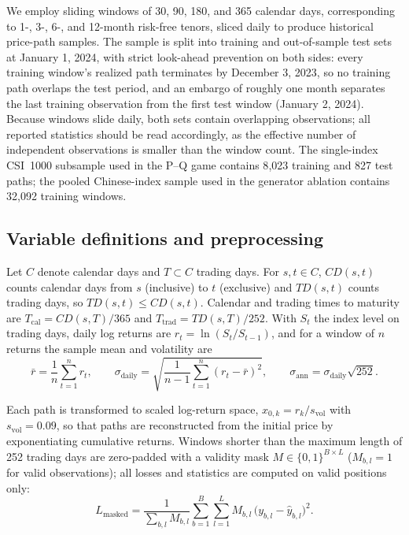 \documentclass[12pt,letterpaper]{article}
\begin{document}
We employ sliding windows of 30, 90, 180, and 365 calendar days,
corresponding to 1-, 3-, 6-, and 12-month risk-free tenors, sliced daily to
produce historical price-path samples. The sample is split into training and
out-of-sample test sets at January 1, 2024, with strict look-ahead
prevention on both sides: every training window's realized path terminates
by December 3, 2023, so no training path overlaps the test period, and an
embargo of roughly one month separates the last training observation from
the first test window (January 2, 2024). Because windows slide daily, both
sets contain overlapping observations; all reported statistics should be
read accordingly, as the effective number of independent observations is
smaller than the window count. The single-index CSI~1000 subsample used in the P--Q game
contains 8{,}023 training and 827 test paths; the pooled Chinese-index sample
used in the generator ablation contains 32{,}092 training windows.

\subsection{Variable definitions and preprocessing}

Let $C$ denote calendar days and $T \subset C$ trading days. For
$s, t \in C$, $CD(s,t)$ counts calendar days from $s$ (inclusive) to $t$
(exclusive) and $TD(s,t)$ counts trading days, so $TD(s,t) \le CD(s,t)$.
Calendar and trading times to maturity are $T_{\mathrm{cal}} = CD(s,T)/365$
and $T_{\mathrm{trad}} = TD(s,T)/252$. With $S_t$ the index level on trading
days, daily log returns are $r_t = \ln(S_t / S_{t-1})$, and for a window of
$n$ returns the sample mean and volatility are
\begin{equation}
\bar r = \frac{1}{n}\sum_{t=1}^{n} r_t,
\qquad
\sigma_{\mathrm{daily}} = \sqrt{\frac{1}{n-1}\sum_{t=1}^{n}(r_t - \bar r)^2},
\qquad
\sigma_{\mathrm{ann}} = \sigma_{\mathrm{daily}}\sqrt{252}.
\end{equation}

Each path is transformed to scaled log-return space,
$x_{0,k} = r_k / s_{\mathrm{vol}}$ with $s_{\mathrm{vol}} = 0.09$, so that
paths are reconstructed from the initial price by exponentiating cumulative
returns. Windows shorter than the maximum length of 252 trading days are
zero-padded with a validity mask $M \in \{0,1\}^{B\times L}$
($M_{b,l} = 1$ for valid observations); all losses and statistics are
computed on valid positions only:
\begin{equation}
L_{\mathrm{masked}} = \frac{1}{\sum_{b,l} M_{b,l}}
\sum_{b=1}^{B}\sum_{l=1}^{L} M_{b,l}\,\bigl(y_{b,l} - \hat y_{b,l}\bigr)^2 .
\label{eq:maskedmse}
\end{equation}
\end{document}
